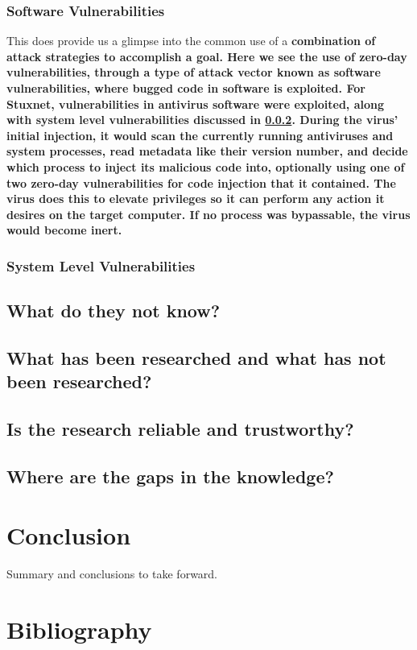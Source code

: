 \documentclass[a4paper, 11pt]{article}
\begin{document}
\subsubsection{Software Vulnerabilities}
\label{sec:softwarevul}
This does provide us a glimpse into the common use of a \bfseries combination \mdseries of attack strategies to accomplish a goal. Here we see the use of zero-day vulnerabilities, through a type of attack vector known as software vulnerabilities, where bugged code in software is exploited. \cite{ref:singer2014cybersecurity} For Stuxnet, vulnerabilities in antivirus software were exploited, along with system level vulnerabilities discussed in  \ref{sec:systemlevel}. During the virus' initial injection, it would scan the currently running antiviruses and system processes, read metadata like their version number, and decide which process to inject its malicious code into, optionally using one of two zero-day vulnerabilities for code injection that it contained. \cite{ref:stuxnet2011report} The virus does this to elevate privileges so it can perform any action it desires on the target computer. \cite{ref:stuxnet2011report} If no process was bypassable, the virus would become inert. \cite{ref:stuxnet2011report}

\subsubsection{System Level Vulnerabilities}
\label{sec:systemlevel}


\subsection{What do they not know?}


\subsection{What has been researched and what has not been researched?}


\subsection{Is the research reliable and trustworthy?}


\subsection{Where are the gaps in the knowledge?}

\section{Conclusion}
Summary and conclusions to take forward.

\section{Bibliography}


\end{document}
